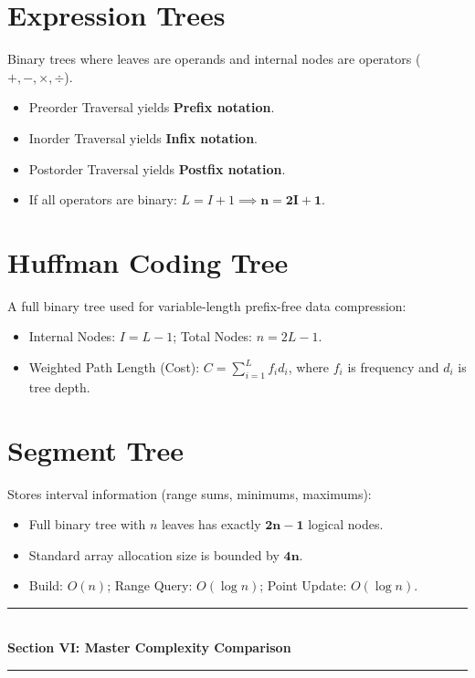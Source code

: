 \section{Expression Trees}
Binary trees where leaves are operands and internal nodes are operators ($+,-,\times,\div$).
\begin{itemize}
    \item Preorder Traversal yields \textbf{Prefix notation}.
    \item Inorder Traversal yields \textbf{Infix notation}.
    \item Postorder Traversal yields \textbf{Postfix notation}.
    \item If all operators are binary: $L = I + 1 \implies \mathbf{n = 2I + 1}$.
\end{itemize}

\section{Huffman Coding Tree}
A full binary tree used for variable-length prefix-free data compression:
\begin{itemize}
    \item Internal Nodes: $I = L - 1$; Total Nodes: $n = 2L - 1$.
    \item Weighted Path Length (Cost): $C = \sum_{i=1}^L f_i d_i$, where $f_i$ is frequency and $d_i$ is tree depth.
\end{itemize}

\section{Segment Tree}
Stores interval information (range sums, minimums, maximums):
\begin{itemize}
    \item Full binary tree with $n$ leaves has exactly $\mathbf{2n - 1}$ logical nodes.
    \item Standard array allocation size is bounded by $\mathbf{4n}$.
    \item Build: $O(n)$; Range Query: $O(\log n)$; Point Update: $O(\log n)$.
\end{itemize}

\begin{center}
\vspace{1em}
{\color{primary}\rule{0.45\textwidth}{1.2pt}}\\[4pt]
{\Large\bfseries\color{primary} Section VI: Master Complexity Comparison}\\[2pt]
{\color{primary}\rule{0.45\textwidth}{1.2pt}}
\vspace{0.5em}
\end{center}

